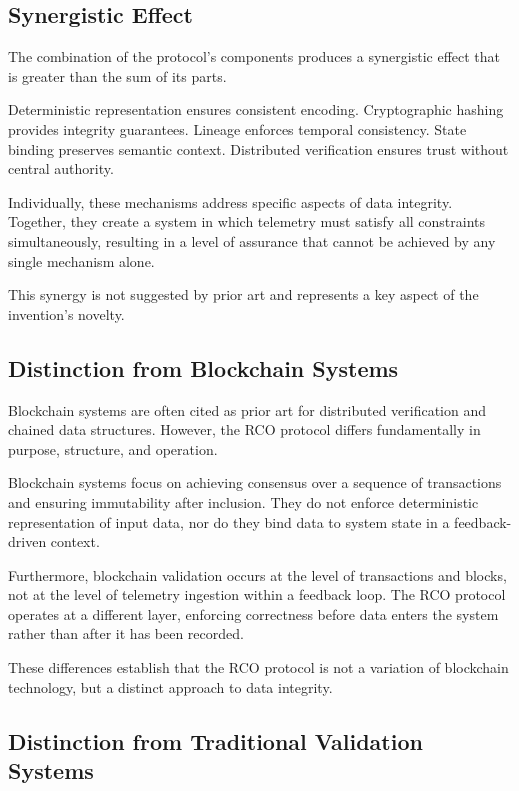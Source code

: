 \subsection{Synergistic Effect}

The combination of the protocol’s components produces a synergistic effect that is greater than the sum of its parts.

Deterministic representation ensures consistent encoding. Cryptographic hashing provides integrity guarantees. Lineage enforces temporal consistency. State binding preserves semantic context. Distributed verification ensures trust without central authority.

Individually, these mechanisms address specific aspects of data integrity. Together, they create a system in which telemetry must satisfy all constraints simultaneously, resulting in a level of assurance that cannot be achieved by any single mechanism alone.

This synergy is not suggested by prior art and represents a key aspect of the invention’s novelty.

\subsection{Distinction from Blockchain Systems}

Blockchain systems are often cited as prior art for distributed verification and chained data structures. However, the RCO protocol differs fundamentally in purpose, structure, and operation.

Blockchain systems focus on achieving consensus over a sequence of transactions and ensuring immutability after inclusion. They do not enforce deterministic representation of input data, nor do they bind data to system state in a feedback-driven context.

Furthermore, blockchain validation occurs at the level of transactions and blocks, not at the level of telemetry ingestion within a feedback loop. The RCO protocol operates at a different layer, enforcing correctness before data enters the system rather than after it has been recorded.

These differences establish that the RCO protocol is not a variation of blockchain technology, but a distinct approach to data integrity.

\subsection{Distinction from Traditional Validation Systems}

